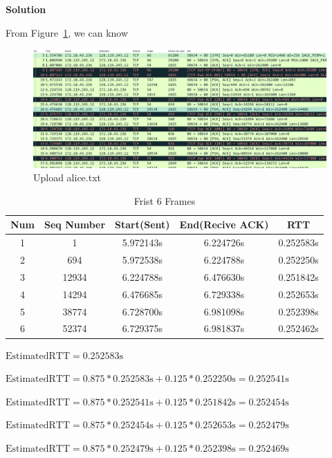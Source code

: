 \documentclass[12pt,letterpaper]{ctexart}
\begin{document}
{\bf Solution}


From Figure~\ref{fig:rtt}, we can know

\begin{figure}[H]
  \centering
  \includegraphics[width=\linewidth]{assets/rtt.png}
  \caption{Upload alice.txt}
  \label{fig:rtt}
\end{figure}

\begin{table}
  \centering
  \caption{Frist 6 Frames}
  \begin{tabular*}{\linewidth}{ccccc}
  \hline
  Num & Seq Number & Start(Sent) & End(Recive ACK)  & RTT \\
  \hline
  1   & 1          & 5.972143s   & 6.224726s        & 0.252583s \\
  2   & 694        & 5.972538s   & 6.224788s        & 0.252250s \\
  3   & 12934      & 6.224788s   & 6.476630s        & 0.251842s \\
  4   & 14294      & 6.476685s   & 6.729338s        & 0.252653s \\
  5   & 38774      & 6.728700s   & 6.981098s        & 0.252398‬s \\
  6   & 52374      & 6.729375s   & 6.981837‬s‬        & 0.252462s \\
  \hline
  \end{tabular*}
\end{table}

$\text{EstimatedRTT} = 0.252583\text{s}$

$\text{EstimatedRTT} = 0.875 * 0.252583\text{s} + 0.125 * 0.252250\text{s} = 0.252541\text{s}$

$\text{EstimatedRTT} = 0.875 * 0.252541\text{s} + 0.125 * 0.251842\text{s} = 0.252454‬\text{s}$

$\text{EstimatedRTT} = 0.875 * 0.252454\text{s} + 0.125 * 0.252653\text{s} = ‭0.252479\text{s}$

$\text{EstimatedRTT} = 0.875 * 0.252479‬‬\text{s} + 0.125 * 0.252398\text{s} = 0.252469\text{s}$
\end{document}
